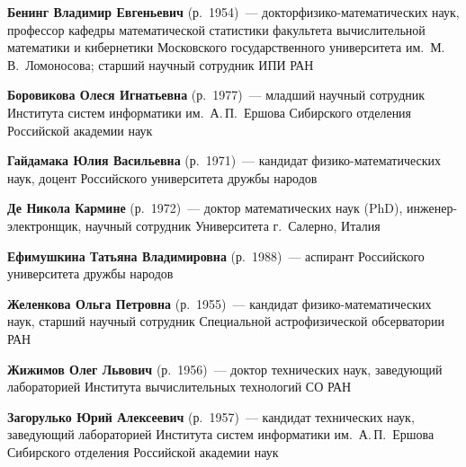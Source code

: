 \begin{multicols}{2}



\noindent
\textbf{Бенинг Владимир Евгеньевич} (р.\ 1954)~--- 
доктор\linebreak фи\-зи\-ко-ма\-те\-ма\-ти\-че\-ских наук, профессор кафедры 
математической статистики факультета вычислительной математики и 
кибернетики Московского государственного университета им.\ М.\,В.~Ломоносова; 
старший научный сотрудник ИПИ РАН

\vspace*{4pt}

\noindent
\textbf{Боровикова Олеся Игнатьевна} (р.\ 1977)~--- младший научный сотрудник Института систем 
информатики им.\ А.\,П.~Ершова Сибирского отделения Российской академии наук

\vspace*{4pt}

\noindent
\textbf{Гайдамака Юлия Васильевна} (р.\ 1971)~--- кандидат фи\-зи\-ко-ма\-те\-ма\-ти\-че\-ских 
наук, доцент  Российского университета дружбы народов

\vspace*{4pt}

\noindent
\textbf{Де Никола Кармине} (р.\ 1972)~--- доктор математических наук (PhD), 
ин\-же\-нер-электронщик, научный сотрудник Университета г.\ Салерно, Италия

\vspace*{4pt}

\noindent
\textbf{Ефимушкина Татьяна Владимировна} (р.\ 1988)~--- аспирант Российского университета дружбы народов

\vspace*{4pt}

\noindent
\textbf{Желенкова Ольга Петровна} (р.\ 1955)~---  кандидат фи\-зи\-ко-ма\-те\-ма\-ти\-че\-ских наук, 
старший научный сотрудник Специальной астрофизической обсерватории РАН

\vspace*{4pt}

\noindent
\textbf{Жижимов Олег Львович} (р.\ 1956)~--- доктор технических наук, 
заведующий лабораторией Института вычислительных технологий СО РАН

\vspace*{4pt}

\noindent
\textbf{Загорулько Юрий Алексеевич} (р.\ 1957)~--- кандидат технических наук, 
заведующий лабораторией Института систем информатики им.\ А.\,П.~Ершова Сибирского отделения 
Российской академии наук


\end{multicols}
